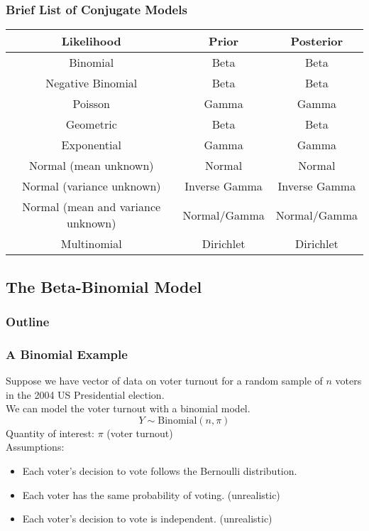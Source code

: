\documentclass[handout]{beamer}
\begin{document}
\begin{frame}
\frametitle{Brief List of Conjugate Models}
\pause
\scriptsize
\begin{table}
\begin{center}
\begin{tabular}{c|c|c}
Likelihood & Prior & Posterior\\
\hline
Binomial & Beta & Beta\\
Negative Binomial & Beta & Beta\\
Poisson & Gamma & Gamma\\
Geometric & Beta & Beta\\
Exponential & Gamma & Gamma\\
Normal (mean unknown) & Normal & Normal\\
Normal (variance unknown) & Inverse Gamma & Inverse Gamma\\
Normal (mean and variance unknown) & Normal/Gamma & Normal/Gamma\\
Multinomial & Dirichlet & Dirichlet
\end{tabular}
\end{center}
\end{table}
\normalsize
\end{frame}

\subsection{The Beta-Binomial Model}

\begin{frame}
\frametitle{Outline}
\tableofcontents[currentsubsection]
\end{frame}


\begin{frame}
\frametitle{A Binomial Example}
\pause
Suppose we have vector of data on voter turnout for a random sample of $n$
voters in the 2004 US Presidential election.   \\
\pause
\bigskip
We can model the voter turnout with a binomial model.\\
\pause
\begin{equation*}
Y \sim \mathrm{Binomial}(n, \pi)
\end{equation*}
\pause
\bigskip
Quantity of interest: $\pi$ (voter turnout)\\
\pause
\bigskip
Assumptions:
\pause
\begin{itemize}
\item Each voter's decision to vote follows the Bernoulli
distribution. \pause
\item Each voter has the same probability of voting.  \pause
(unrealistic) \pause
\item Each voter's decision to vote is independent.  \pause (unrealistic)
\end{itemize}
\end{frame}
\end{document}
